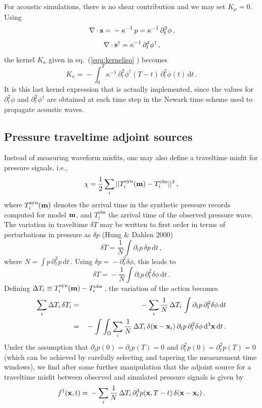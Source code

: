\documentclass[referee,extra]{gji}
\newcommand{\bequ}{\begin{equation} }
\newcommand{\eequ}{\end{equation} }
\newcommand{\barr}{\begin{eqnarray} }
\newcommand{\earr}{\end{eqnarray} }
\newcommand{\bnabla}{ \, {\bf \nabla } }
\newcommand{\bs}{ {\bf s } }
\newcommand{\bm}{ {\bf m } }
\newcommand{\bx}{ {\bf x } }
\begin{document}
\begin{appendices}
For acoustic simulations, there is no shear contribution and we may set $K_\mu = 0$.
Using
\bequ
 \bnabla \cdot \bs = \mbox{}- \kappa^{-1} \, p  =  \kappa^{-1} \, \partial_t^2 \phi \,,
\eequ
\bequ
\bnabla \cdot \bs^\dag = \kappa^{-1} \, \partial_t^2 \phi^\dag \,,
\eequ
the kernel $K_\kappa$ given in eq.~(\ref{equ:kerneliso} ) becomes
\bequ
K_\kappa   = \mbox{} - \int_0^T  \kappa^{-1} \,  \partial_t^2 \phi^\dag (T-t )\,  \partial_t^2 \phi (t ) \, \mathrm{d}t\, .
\eequ
It is this last kernel expression that is actually implemented,
since the values for $ \partial_t^2 \phi $ and $ \partial_t^2 \phi^\dag$ are obtained at each time step
in the Newark time scheme used to propagate acoustic waves.


\subsection{Pressure traveltime adjoint sources}\label{appendix:acoustickernels2}

Instead of measuring waveform misfits, one may also define a traveltime misfit for pressure signals, i.e.,
\bequ
\chi = \frac{1}{2}  \sum_i  || T_i^{\mathrm{syn}}(\bm) - T_i^{\mathrm{obs}}||^2 \,,
\eequ
where $T_i^{\mathrm{syn}}(\bm)$ denotes the arrival time in the synthetic pressure records
computed for model $\bm$, and $T_i^{\mathrm{obs}}$ the arrival time of the observed pressure wave.
The variation in traveltime $\delta T$ may be written to first order in terms of perturbations in pressure as $\delta p$ (Hung \& Dahlen 2000)
\bequ
\delta T = \frac{1}{N} \int \partial_t p \, \delta p \, \mathrm{d}t \,,
\eequ
where $ N =  \int p\,\partial_t^2 p\, \mathrm{d}t$\,.
Using $ \delta p = \mbox{}- \partial_t^2 \delta \phi $, this leads to
\bequ
\delta T = \mbox{}- \frac{1}{N} \int \partial_t p \, \partial_t^2 \delta \phi \, \mathrm{d}t\, .
\eequ
Defining $\Delta T_i \equiv T_i^{\mathrm{syn}}(\bm) - T_i^{\mathrm{obs}} $\,,
the variation of the action becomes
\barr
\sum_i \Delta T_i\, \delta T_i
& = & \mbox{}- \sum_i \frac{1}{N} \,\Delta T_i \,\int \partial_t p \, \partial_t^2 \delta \phi \, \mathrm{d}t  \\
& = & \mbox{}- \int \int_\Omega \sum_i  \frac{1}{N}\, \Delta T_i\, \delta(\bx - \bx_{i}) \,\partial_t p \, \partial_t^2 \delta \phi \,  \mathrm{d}^3\bx \, \mathrm{d}t  \,.
\earr
Under the assumption that $\partial_t p(0) = \partial_t p(T) = 0$ and $\partial_t^2 p (0) = \partial_t^2 p(T) = 0$
(which can be achieved by carefully selecting and tapering the measurement time windows),
we find after some further manipulation that the adjoint source for a traveltime misfit between observed
and simulated pressure signals is given by
\bequ
f^\dag ( \bx, t) = \mbox{}- \sum_i \frac{1}{N} \, \Delta T_i \, \partial_t^3 p( \bx, T- t)  \,  \delta( \bx - \bx_{i} ) \,.
\eequ


\end{appendices}
\end{document}
